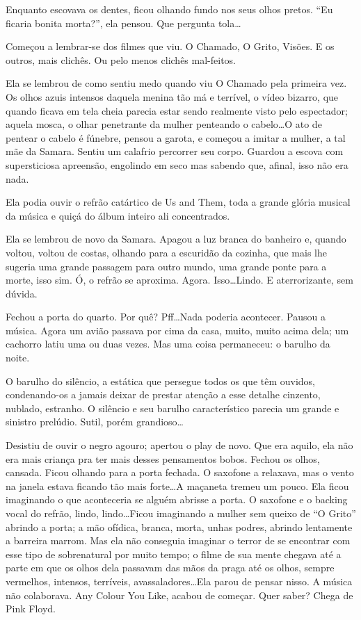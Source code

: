 Enquanto escovava os dentes, ficou olhando fundo nos seus olhos pretos. ``Eu ficaria bonita morta?'', ela pensou. Que pergunta tola\ldots

Começou a lembrar-se dos filmes que viu. O Chamado, O Grito, Visões. E os outros, mais clichês. Ou pelo menos clichês mal-feitos.

Ela se lembrou de como sentiu medo quando viu O Chamado pela primeira vez. Os olhos azuis intensos daquela menina tão má e terrível, o vídeo bizarro, que quando ficava em tela cheia parecia estar sendo realmente visto pelo espectador; aquela mosca, o olhar penetrante da mulher penteando o cabelo\ldots O ato de pentear o cabelo é fúnebre, pensou a garota, e começou a imitar a mulher, a tal mãe da Samara. Sentiu um calafrio percorrer seu corpo. Guardou a escova com supersticiosa apreensão, engolindo em seco mas sabendo que, afinal, isso não era nada.

Ela podia ouvir o refrão catártico de Us and Them, toda a grande glória musical da música e quiçá do álbum inteiro ali concentrados.

Ela se lembrou de novo da Samara. Apagou a luz branca do banheiro e, quando voltou, voltou de costas, olhando para a escuridão da cozinha, que mais lhe sugeria uma grande passagem para outro mundo, uma grande ponte para a morte, isso sim. Ó, o refrão se aproxima. Agora. Isso\ldots Lindo. E aterrorizante, sem dúvida.

Fechou a porta do quarto. Por quê? Pff\ldots Nada poderia acontecer. Pausou a música. Agora um avião passava por cima da casa, muito, muito acima dela; um cachorro latiu uma ou duas vezes. Mas uma coisa permaneceu: o barulho da noite.

O barulho do silêncio, a estática que persegue todos os que têm ouvidos, condenando-os a jamais deixar de prestar atenção a esse detalhe cinzento, nublado, estranho. O silêncio e seu barulho característico parecia um grande e sinistro prelúdio. Sutil, porém grandioso\ldots

Desistiu de ouvir o negro agouro; apertou o play de novo. Que era aquilo, ela não era mais criança pra ter mais desses pensamentos bobos. Fechou os olhos, cansada. Ficou olhando para a porta fechada. O saxofone a relaxava, mas o vento na janela estava ficando tão mais forte\ldots A maçaneta tremeu um pouco. Ela ficou imaginando o que aconteceria se alguém abrisse a porta. O saxofone e o backing vocal do refrão, lindo, lindo\ldots Ficou imaginando a mulher sem queixo de ``O Grito'' abrindo a porta; a mão ofídica, branca, morta, unhas podres, abrindo lentamente a barreira marrom. Mas ela não conseguia imaginar o terror de se encontrar com esse tipo de sobrenatural por muito tempo; o filme de sua mente chegava até a parte em que os olhos dela passavam das mãos da praga até os olhos, sempre vermelhos, intensos, terríveis, avassaladores\ldots Ela parou de pensar nisso. A música não colaborava. Any Colour You Like, acabou de começar. Quer saber? Chega de Pink Floyd.

